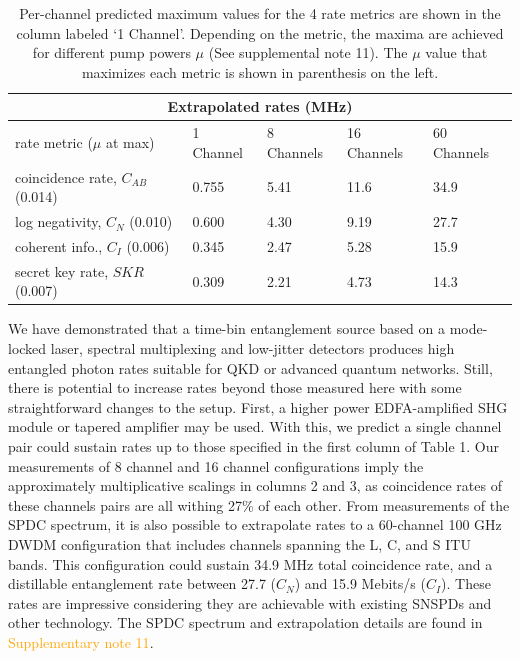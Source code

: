 \documentclass[11pt]{caltech_thesis} %
\begin{document}
\begin{table}
\begin{tabular}{ |p{3.5cm}||p{2.5cm}|p{2.5cm}|p{2.5cm}|p{2.5cm}|}
 \hline
 \multicolumn{5}{|c|}{Extrapolated rates (MHz)} \\
 \hline
 \makecell[l]{rate metric \\ ($\mu$ at max)}   &  1 Channel & 8 Channels & 16 Channels & 60 Channels \label{table:max_rates}\\
 \hline
 \makecell[l]{coincidence rate, $C_{AB}$ \\(0.014)} & 0.755 & 5.41    &  11.6  &  34.9     \\
 \hline
 \makecell[l]{log negativity, $C_N$ \\(0.010)}& 0.600 & 4.30    &  9.19  &  27.7   \\
 \hline
 \makecell[l]{coherent info., $C_I$ \\(0.006)}& 0.345 & 2.47 &  5.28  &  15.9 \\
 \hline
 \makecell[l]{secret key rate, $SKR$ \\(0.007)}& 0.309 & 2.21 &  4.73  &  14.3 \\
 \hline
\end{tabular}
\caption[{Extrapolating entanglement rates to more channels}]{Per-channel predicted maximum values for the 4 rate metrics are shown in the column labeled `1 Channel'. Depending on the metric, the maxima are achieved for different pump powers $\mu$ (See supplemental note 11). The $\mu$ value that maximizes each metric is shown in parenthesis on the left.}
\label{table:maximum_rates}
\end{table}

We have demonstrated that a time-bin entanglement source based on a mode-locked laser, spectral multiplexing and low-jitter detectors produces high entangled photon rates suitable for QKD or advanced quantum networks. Still, there is potential to increase rates beyond those measured here with some straightforward changes to the setup. First, a higher power EDFA-amplified SHG module or tapered amplifier may be used. With this, we predict a single channel pair could sustain rates up to those specified in the first column of Table 1. Our measurements of 8 channel and 16 channel configurations imply the approximately multiplicative scalings in columns 2 and 3, as coincidence rates of these channels pairs are all withing 27\% of each other. From measurements of the SPDC spectrum, it is also possible to extrapolate rates to a 60-channel 100 GHz DWDM configuration that includes channels spanning the L, C, and S ITU bands. This configuration could sustain 34.9 MHz total coincidence rate, and a distillable entanglement rate between 27.7 ($C_N$) and 15.9 Mebits/s ($C_I$). These rates are impressive considering they are achievable with existing SNSPDs and other technology. The SPDC spectrum and extrapolation details are found in \textcolor{orange}{Supplementary note 11}.
\end{document}
